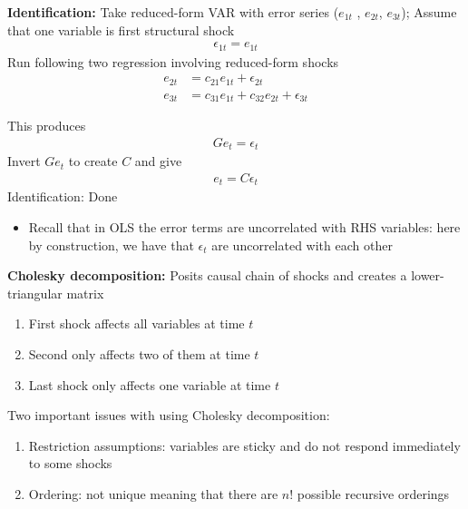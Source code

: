 \documentclass{beamer}
\begin{document}
\begin{frame}
  \textbf{Identification:} Take reduced-form VAR with error series ($e_{1t}$ , $e_{2t}$, $e_{3t}$); Assume that one variable is first structural shock
  \begin{align}
    \epsilon_{1t} = e_{1t} 
  \end{align}
  \medskip
  Run following two regression involving reduced-form shocks
  \begin{align}
    e_{2t} &= c_{21}e_{1t} + \epsilon_{2t}\\
    e_{3t} &= c_{31}e_{1t} + c_{32}e_{2t} + \epsilon_{3t}  
  \end{align}  
\end{frame}

\begin{frame}
  This produces
  \begin{align}
    Ge_t= \epsilon_t
  \end{align}
  \medskip
  Invert $Ge_t$ to create $C$ and give
  \begin{align}
    e_t= C\epsilon_t
  \end{align}
  \medskip
  Identification: Done
  \begin{itemize}
    \item Recall that in OLS the error terms are uncorrelated with RHS variables: here by construction, we have that $\epsilon_t$ are uncorrelated with each other
  \end{itemize}  
\end{frame}

\begin{frame}
  \textbf{Cholesky decomposition:} Posits causal chain of shocks and creates a lower-triangular matrix
  \medskip
  \begin{enumerate}
  \item First shock affects all variables at time $t$
  \item Second only affects two of them at time $t$
  \item Last shock only affects one variable at time $t$
\end{enumerate} 
\end{frame}

\begin{frame}
 Two important issues with using Cholesky decomposition: \medskip
 \begin{enumerate}
   \item Restriction assumptions: variables are sticky and do not respond immediately to some shocks
   \item Ordering: not unique meaning that there are $n!$ possible recursive orderings
 \end{enumerate} 
\end{frame}
\end{document}
